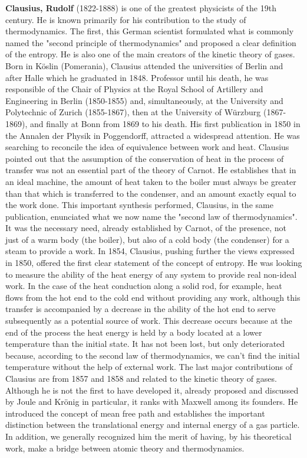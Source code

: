 \textbf{Clausius, Rudolf} (1822-1888) is one of the greatest physicists of the 19th century. He is known primarily for his contribution to the study of thermodynamics. The first, this German scientist formulated what is commonly named the "second principle of thermodynamics" and proposed a clear definition of the entropy. He is also one of the main creators of the kinetic theory of gases. Born in Köslin (Pomerania), Clausius attended the universities of Berlin and after Halle which he graduated in 1848. Professor until his death, he was responsible of the Chair of Physics at the Royal School of Artillery and Engineering in Berlin (1850-1855) and, simultaneously, at the University and Polytechnic of Zurich (1855-1867), then at the University of Würzburg (1867-1869), and finally at Bonn from 1869 to his death. His first publication in 1850 in the Annalen der Physik in Poggendorff, attracted a widespread attention. He was searching to reconcile the idea of equivalence between work and heat. Clausius pointed out that the assumption of the conservation of heat in the process of transfer was not an essential part of the theory of Carnot. He establishes that in an ideal machine, the amount of heat taken to the boiler must always be greater than that which is transferred to the condenser, and an amount exactly equal to the work done. This important synthesis performed, Clausius, in the same publication, enunciated what we now name the "second law of thermodynamics". It was the necessary need, already established by Carnot, of the presence, not just of a warm body (the boiler), but also of a cold body (the condenser) for a steam to provide a work. In 1854, Clausius, pushing further the views expressed in 1850, offered the first clear statement of the concept of entropy. He was looking to measure the ability of the heat energy of any system to provide real non-ideal work. In the case of the heat conduction along a solid rod, for example, heat flows from the hot end to the cold end without providing any work, although this transfer is accompanied by a decrease in the ability of the hot end to serve subsequently as a potential source of work. This decrease occurs because at the end of the process the heat energy is held by a body located at a lower temperature than the initial state. It has not been lost, but only deteriorated because, according to the second law of thermodynamics, we can't find the initial temperature without the help of external work. The last major contributions of Clausius are from 1857 and 1858 and related to the kinetic theory of gases. Although he is not the first to have developed it, already proposed and discussed by Joule and Krönig in particular, it ranks with Maxwell among its founders. He introduced the concept of mean free path and establishes the important distinction between the translational energy and internal energy of a gas particle. In addition, we generally recognized him the merit of having, by his theoretical work, make a bridge between atomic theory and thermodynamics.

